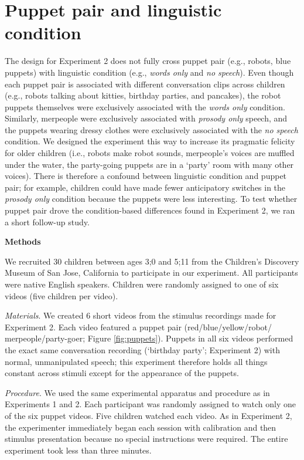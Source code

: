 \documentclass[authoryear, 12pt]{elsarticle}
\begin{document}
\section{Puppet pair and linguistic condition}
\label{sec:puppetconfound}
\setcounter{figure}{0}  
The design for Experiment 2 does not fully cross puppet pair (e.g., robots, blue puppets) with linguistic condition (e.g., \textit{words only} and \textit{no speech}). Even though each puppet pair is associated with different conversation clips across children (e.g., robots talking about kitties, birthday parties, and pancakes), the robot puppets themselves were exclusively associated with the \textit{words only} condition. Similarly, merpeople were exclusively associated with \textit{prosody only} speech, and the puppets wearing dressy clothes were exclusively associated with the \textit{no speech} condition. We designed the experiment this way to increase its pragmatic felicity for older children (i.e., robots make robot sounds, merpeople's voices are muffled under the water, the party-going puppets are in a `party' room with many other voices). There is therefore a confound between linguistic condition and puppet pair; for example, children could have made fewer anticipatory switches in the \textit{prosody only} condition because the puppets were less interesting. To test whether puppet pair drove the condition-based differences found in Experiment 2, we ran a short follow-up study.

\newpage
\noindent \textbf{Methods}
\medskip

\noindent We recruited 30 children between ages 3;0 and 5;11 from the Children's Discovery Museum of San Jose, California to participate in our experiment. All participants were native English speakers. Children were randomly assigned to one of six videos (five children per video).

\medskip
\noindent \textit{Materials}. We created 6 short videos from the stimulus recordings made for Experiment 2. Each video featured a puppet pair (red/blue/yellow/robot/ merpeople/party-goer; Figure \ref{fig:puppets}). Puppets in all six videos performed the exact same conversation recording (`birthday party'; Experiment 2) with normal, unmanipulated speech; this experiment therefore holds all things constant across stimuli except for the appearance of the puppets.
 
\medskip
\noindent \textit{Procedure}. We used the same experimental apparatus and procedure as in Experiments 1 and 2. Each participant was randomly assigned to watch only one of the six puppet videos. Five children watched each video. As in Experiment 2, the experimenter immediately began each session with calibration and then stimulus presentation because no special instructions were required. The entire experiment took less than three minutes.
\end{document}
